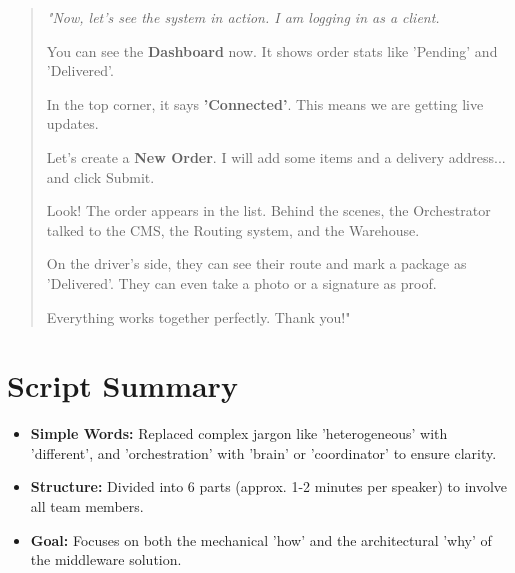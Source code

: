 \documentclass[12pt,a4paper]{article}
\newenvironment{scriptquote}
{\begin{quote}\itshape\color{navy!90}}
{\end{quote}}
\begin{document}
\begin{scriptquote}
"Now, let’s see the system in action. I am logging in as a client.

You can see the \textbf{Dashboard} now. It shows order stats like 'Pending' and 'Delivered'.

In the top corner, it says \textbf{'Connected'}. This means we are getting live updates.

Let's create a \textbf{New Order}. I will add some items and a delivery address... and click Submit.

Look! The order appears in the list. Behind the scenes, the Orchestrator talked to the CMS, the Routing system, and the Warehouse.

On the driver's side, they can see their route and mark a package as 'Delivered'. They can even take a photo or a signature as proof.

Everything works together perfectly. Thank you!"
\end{scriptquote}

\newpage
\section{Script Summary}
\begin{itemize}
    \item \textbf{Simple Words:} Replaced complex jargon like 'heterogeneous' with 'different', and 'orchestration' with 'brain' or 'coordinator' to ensure clarity.
    \item \textbf{Structure:} Divided into 6 parts (approx. 1-2 minutes per speaker) to involve all team members.
    \item \textbf{Goal:} Focuses on both the mechanical 'how' and the architectural 'why' of the middleware solution.
\end{itemize}
\end{document}
